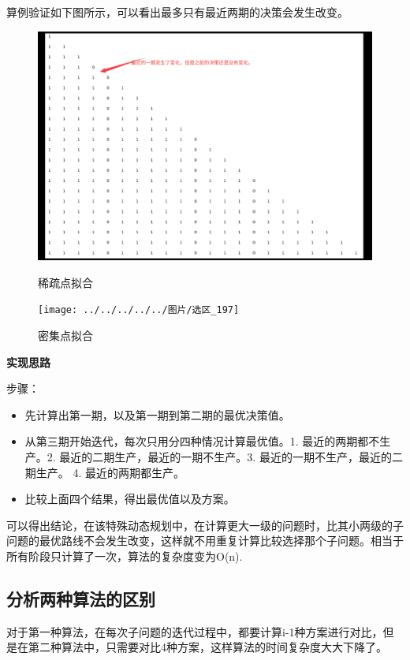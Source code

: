 \documentclass[UTF8]{ctexart}
\begin{document}
算例验证如下图所示，可以看出最多只有最近两期的决策会发生改变。

\begin{figure}[H]                 
    \centering
    \begin{minipage}[t]{1\textwidth}
        \centering
        \includegraphics[width=12cm]{11.png}
        \caption{稀疏点拟合}
    \end{minipage}
    \begin{minipage}[t]{1\textwidth}
        \centering
        \texttt{[image: ../../../../../图片/选区\_197]}
        \caption{密集点拟合}
    \end{minipage}
\end{figure}


\textbf{实现思路}

步骤：
\begin{itemize}
    \item 先计算出第一期，以及第一期到第二期的最优决策值。
    \item 从第三期开始迭代，每次只用分四种情况计算最优值。1. 最近的两期都不生产。2. 最近的二期生产，最近的一期不生产。3. 最近的一期不生产，最近的二期生产。 4. 最近的两期都生产。
    \item 比较上面四个结果，得出最优值以及方案。
\end{itemize}

可以得出结论，在该特殊动态规划中，在计算更大一级的问题时，比其小两级的子问题的最优路线不会发生改变，这样就不用重复计算比较选择那个子问题。相当于所有阶段只计算了一次，算法的复杂度变为O(n).


\subsection{分析两种算法的区别}
对于第一种算法，在每次子问题的迭代过程中，都要计算i-1种方案进行对比，但是在第二种算法中，只需要对比4种方案，这样算法的时间复杂度大大下降了。
\end{document}
